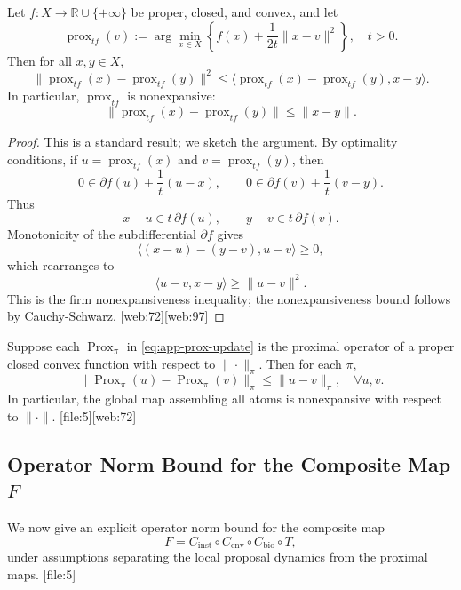 \documentclass[11pt]{article}
\begin{document}
\begin{proposition}
Let \(f:X\to\mathbb{R}\cup\{+\infty\}\) be proper, closed, and convex, and let
\[
  \operatorname{prox}_{t f}(v) := \arg\min_{x\in X} \left\{ f(x) + \frac{1}{2t}\|x-v\|^2 \right\},\quad t>0.
\]
Then for all \(x,y\in X\),
\[
  \|\operatorname{prox}_{t f}(x) - \operatorname{prox}_{t f}(y)\|^2 \leq
  \langle \operatorname{prox}_{t f}(x) - \operatorname{prox}_{t f}(y), x - y \rangle.
\]
In particular, \(\operatorname{prox}_{t f}\) is nonexpansive:
\[
  \|\operatorname{prox}_{t f}(x) - \operatorname{prox}_{t f}(y)\| \leq \|x - y\|.
\]
\label{prop:prox-nonexp}
\end{proposition}

\begin{proof}
This is a standard result; we sketch the argument. By optimality conditions, if \(u = \operatorname{prox}_{t f}(x)\) and \(v = \operatorname{prox}_{t f}(y)\), then
\[
  0 \in \partial f(u) + \frac{1}{t}(u - x), \qquad
  0 \in \partial f(v) + \frac{1}{t}(v - y).
\]
Thus
\[
  x - u \in t\,\partial f(u), \qquad y - v \in t\,\partial f(v).
\]
Monotonicity of the subdifferential \(\partial f\) gives
\[
  \langle (x - u) - (y - v), u - v \rangle \geq 0,
\]
which rearranges to
\[
  \langle u - v, x - y \rangle \geq \|u - v\|^2.
\]
This is the firm nonexpansiveness inequality; the nonexpansiveness bound follows by Cauchy-Schwarz. [web:72][web:97]
\end{proof}

\begin{corollary}
Suppose each \(\operatorname{Prox}_\pi\) in \eqref{eq:app-prox-update} is the proximal operator of a proper closed convex function with respect to \(\|\cdot\|_\pi\). Then for each \(\pi\),
\[
  \|\operatorname{Prox}_\pi(u) - \operatorname{Prox}_\pi(v)\|_\pi \leq \|u-v\|_\pi,\quad \forall u,v.
\]
In particular, the global map assembling all atoms is nonexpansive with respect to \(\|\cdot\|\). [file:5][web:72]
\end{corollary}

\subsection{Operator Norm Bound for the Composite Map \(F\)}

We now give an explicit operator norm bound for the composite map
\[
  F = C_{\text{inst}}\circ C_{\text{env}}\circ C_{\text{bio}}\circ T,
\]
under assumptions separating the local proposal dynamics from the proximal maps. [file:5]
\end{document}
